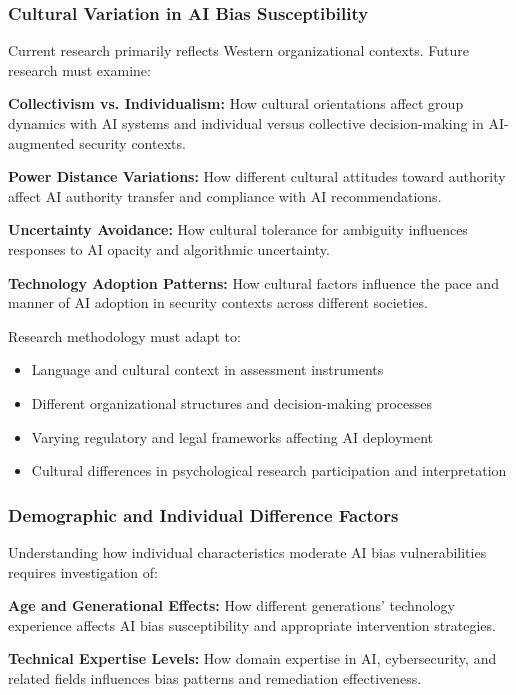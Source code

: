 \documentclass[11pt,a4paper]{article}
\begin{document}
\subsubsection{Cultural Variation in AI Bias Susceptibility}

Current research primarily reflects Western organizational contexts. Future research must examine:

\textbf{Collectivism vs. Individualism:} How cultural orientations affect group dynamics with AI systems and individual versus collective decision-making in AI-augmented security contexts.

\textbf{Power Distance Variations:} How different cultural attitudes toward authority affect AI authority transfer and compliance with AI recommendations.

\textbf{Uncertainty Avoidance:} How cultural tolerance for ambiguity influences responses to AI opacity and algorithmic uncertainty.

\textbf{Technology Adoption Patterns:} How cultural factors influence the pace and manner of AI adoption in security contexts across different societies.

Research methodology must adapt to:
\begin{itemize}
\item Language and cultural context in assessment instruments
\item Different organizational structures and decision-making processes
\item Varying regulatory and legal frameworks affecting AI deployment
\item Cultural differences in psychological research participation and interpretation
\end{itemize}

\subsubsection{Demographic and Individual Difference Factors}

Understanding how individual characteristics moderate AI bias vulnerabilities requires investigation of:

\textbf{Age and Generational Effects:} How different generations' technology experience affects AI bias susceptibility and appropriate intervention strategies.

\textbf{Technical Expertise Levels:} How domain expertise in AI, cybersecurity, and related fields influences bias patterns and remediation effectiveness.
\end{document}
